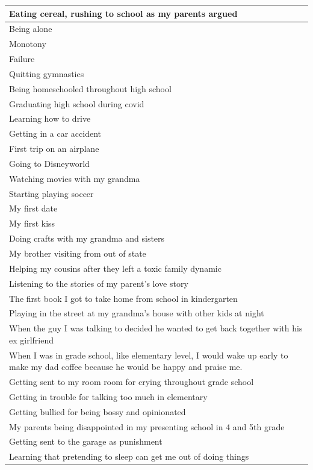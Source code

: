 \documentclass[
  .7em,
  letterpaper,
  DIV=11,
  numbers=noendperiod]{scrartcl}
\begin{document}
\begin{table}
\begin{tabular}{l}
Eating cereal, rushing to school as my parents argued\\
\hline
Being alone\\
\hline
Monotony\\
\hline
Failure\\
\hline
Quitting gymnastics\\
\hline
Being homeschooled throughout high school\\
\hline
Graduating high school during covid\\
\hline
Learning how to drive\\
\hline
Getting in a car accident\\
\hline
First trip on an airplane\\
\hline
Going to Disneyworld\\
\hline
Watching movies with my grandma\\
\hline
Starting playing soccer\\
\hline
My first date\\
\hline
My first kiss\\
\hline
Doing crafts with my grandma and sisters\\
\hline
My brother visiting from out of state\\
\hline
Helping my cousins after they left a toxic family dynamic\\
\hline
Listening to the stories of my parent's love story\\
\hline
The first book I got to take home from school in kindergarten\\
\hline
Playing in the street at my grandma's house with other kids at night\\
\hline
When the guy I was talking to decided he wanted to get back together with his ex girlfriend\\
\hline
When I was in grade school, like elementary level, I would wake up early to make my dad coffee because he would be happy and praise me.\\
\hline
Getting sent to my room room for crying throughout grade school\\
\hline
Getting in trouble for talking too much in elementary\\
\hline
Getting bullied for being bossy and opinionated\\
\hline
My parents being disappointed in my presenting school in 4 and 5th grade\\
\hline
Getting sent to the garage as punishment\\
\hline
Learning that pretending to sleep can get me out of doing things\\

\end{tabular}
\end{table}
\end{document}
